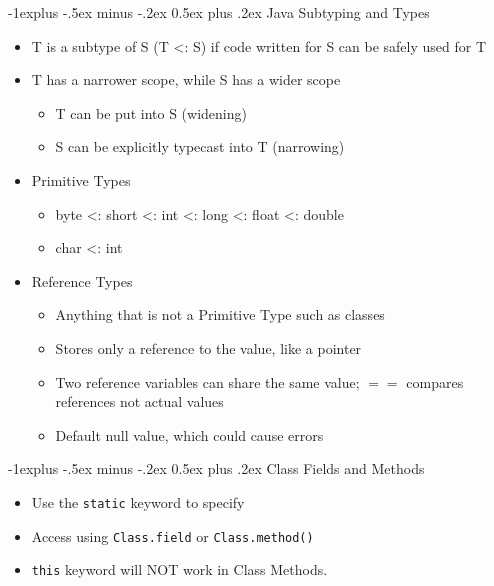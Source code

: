 \documentclass[10pt, landscape]{article}
\makeatletter
\renewcommand{\section}{\@startsection{section}{1}{0mm}%
                                {-1ex plus -.5ex minus -.2ex}%
                                {0.5ex plus .2ex}%
                                {\normalfont\large\bfseries}}
\renewcommand{\section}{\@startsection{section}{2}{0mm}%
                                {-1explus -.5ex minus -.2ex}%
                                {0.5ex plus .2ex}%
                                {\normalfont\normalsize\bfseries}}
\makeatother
\begin{document}
\begin{multicols*}{4}
\section{Java Subtyping and Types}
\begin{itemize}
\item T is a subtype of S (T <: S) if code written for S can be safely used for T \\
\item T has a narrower scope, while S has a wider scope \\
    \begin{itemize}
        \item T can be put into S (widening) \\
        \item S can be explicitly typecast into T (narrowing) \\
    \end{itemize}
\item{Primitive Types}
\begin{itemize}
    \item byte <: short <: int <: long <: float <: double \\
    \item char <: int
\end{itemize}
\item{Reference Types}
\begin{itemize}
    \item Anything that is not a Primitive Type such as classes
    \item Stores only a reference to the value, like a pointer
    \item Two reference variables can share the same value; $==$ compares references not actual values
    \item Default null value, which could cause errors
\end{itemize}
\end{itemize}

\section{Class Fields and Methods}
\begin{itemize}
    \item Use the \verb|static| keyword to specify
    \item Access using \verb|Class.field| or \verb|Class.method()|
    \item \verb|this| keyword will NOT work in Class Methods.
\end{itemize}


\end{multicols*}
\end{document}
